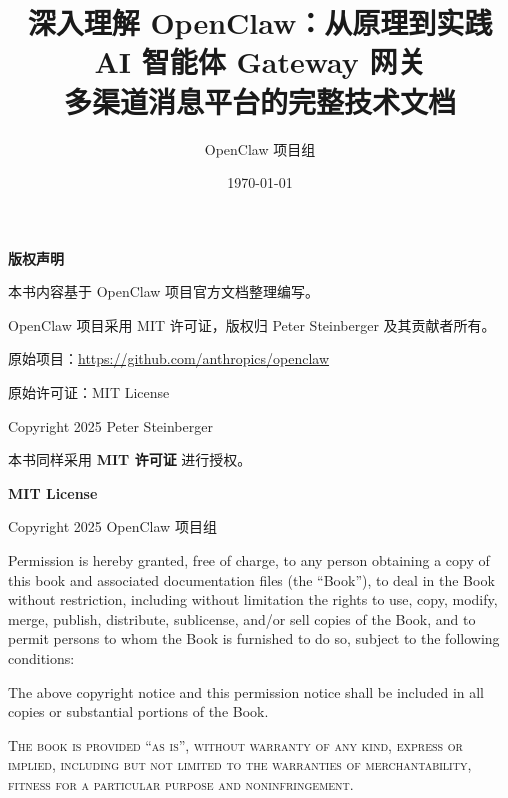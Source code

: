 \documentclass[a4paper,12pt,openany]{book}
\title{
    \vspace{2cm}
    {\Huge\textbf{深入理解 OpenClaw：从原理到实践}} \\
    \vspace{0.5cm}
    {\Large AI 智能体 Gateway 网关} \\
    \vspace{0.5cm}
    {\large 多渠道消息平台的完整技术文档}
    \vspace{2cm}
}
\author{OpenClaw 项目组}
\date{\today}
\begin{document}
\maketitle
\thispagestyle{empty}

\clearpage
\thispagestyle{empty}
\vspace*{\fill}
\begin{center}
{\large\textbf{版权声明}}
\end{center}

\bigskip

\noindent 本书内容基于 OpenClaw 项目官方文档整理编写。

\medskip

\noindent OpenClaw 项目采用 MIT 许可证，版权归 Peter Steinberger 及其贡献者所有。

\medskip

\noindent 原始项目：\url{https://github.com/anthropics/openclaw}

\noindent 原始许可证：MIT License

\noindent Copyright \textcopyright{} 2025 Peter Steinberger

\bigskip

\noindent 本书同样采用 \textbf{MIT 许可证} 进行授权。

\bigskip

\noindent \textbf{MIT License}

\medskip

\noindent Copyright \textcopyright{} 2025 OpenClaw 项目组

\medskip

\noindent Permission is hereby granted, free of charge, to any person obtaining a copy
of this book and associated documentation files (the ``Book''), to deal
in the Book without restriction, including without limitation the rights
to use, copy, modify, merge, publish, distribute, sublicense, and/or sell
copies of the Book, and to permit persons to whom the Book is furnished to
do so, subject to the following conditions:

\medskip

\noindent The above copyright notice and this permission notice shall be included in all
copies or substantial portions of the Book.

\medskip

\noindent \textsc{The book is provided ``as is'', without warranty of any kind, express or
implied, including but not limited to the warranties of merchantability,
fitness for a particular purpose and noninfringement.}
\end{document}
